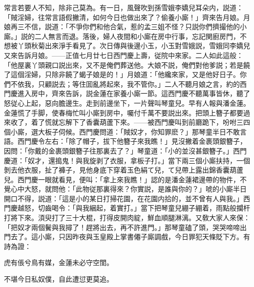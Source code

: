 常言若要人不知，除非己莫為。有一日，風聲吹到孫雪娥李嬌兒耳朵内，説道：「賊淫婦，往常言語假撇清，如何今日也做出來了？偷養小廝！」齊來告月娘。月娘再三不信，説道：「不爭你們和他合氣，惹的孟三姐不怪？只説你們擠撮他的小廝。」説的二人無言而退。落後，婦人夜間和小廝在房中行事，忘記関廚房門，不想被丫頭秋菊出來淨手看見了。次日傳與後邊小玉，小玉對雪娥説，雪娥同李嬌兒又來告訴月娘。——正值七月廿七日西門慶上壽，従院中來家。二人如此這般：「他屋裏丫頭親口説出來，又不是俺們葬送他。大娘不説，俺們對他爹説；若是饒了這個淫婦，只除非饒了蝎子娘是的！」月娘道：「他纔來家，又是他好日子。你們不依我，只顧説去；等住囬亂將起來，我不管你。」二人不聽月娘之言，約的西門慶進入房中，齊來告訴，説金蓮在家養小廝一節。這西門慶不聽萬事皆休，聽了怒従心上起，惡向膽邊生。走到前邊坐下，一片聲叫琴童兒。早有人報與潘金蓮。金蓮慌了手脚，使春梅忙叫小廝到房中，囑付千萬不要説出來。把頭上簪子都要過來收了，着了慌就忘解下了香囊葫蘆下來。——被西門慶叫到前廳跪下，吩咐三四個小廝，選大板子伺候。西門慶問道：「賊奴才，你知罪麽？」那琴童半日不敢言語。西門慶令左右：「除了帽子，拔下他簪子來我瞧！」見沒撇着金裹頭銀簪子，因問：「你戴的金裹頭銀簪子往那裏去了？」琴童道：「小的並沒甚銀簪子。」西門慶道：「奴才，還搗鬼！與我旋剥了衣服，拿板子打。」當下兩三個小廝扶持，一個剝去他衣服，扯了褲子，見他身底下穿着玉色絹て兒，て兒帶上露出錦香囊葫蘆兒。西門慶一眼就看見，便叫：「拿上來我瞧！」認的是潘金蓮裙邊帶的物件，不覺心中大怒，就問他：「此物従那裏得來？你實説，是誰與你的？」唬的小廝半日開口不得，説道：「這是小的某日打掃花園，在花園内拾的，並不曾有人與我。」西門慶越怒，切齒喝令：「與我綑起，着實打。」當下把琴童兒綳子綳着，雨點般攔杆打將下來。湏臾打了三十大棍，打得皮開肉綻，鮮血順腿淋漓。又敎大家人來保：「把奴才兩個鬢與我撏了！趕將出去，再不許進門。」那琴童磕了頭，哭哭啼啼出門去了。這小廝，只因昨夜與玉皇殿上掌書僊子廝調戲，今日罪犯天條貶下方。有詩為證：

虎有倀兮鳥有媒，金蓮未必守空閨。

不堪今日私奴僕，自此遭愆更莫追。

